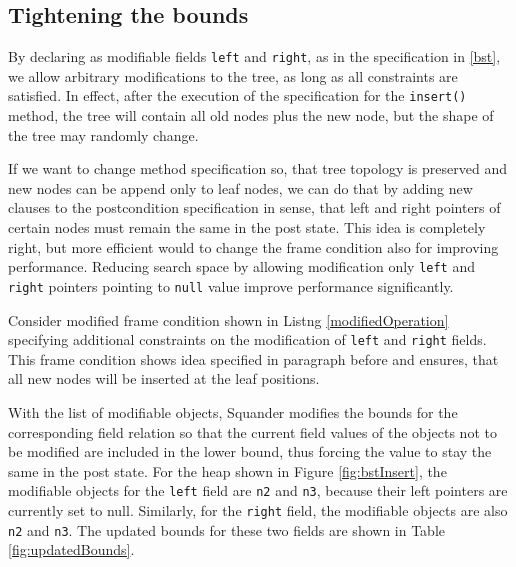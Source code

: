 \documentclass[11pt,twoside,a4paper]{book}
\begin{document}
\subsection{Tightening the bounds}
By declaring as modifiable fields \verb|left| and \verb|right|, as in the
specification in \ref{bst}, we allow arbitrary modifications to the tree, as
long as all constraints are satisfied. In effect, after the execution of the
specification for the \verb|insert()| method, the tree will contain all old
nodes plus the new node, but the shape of the tree may randomly change.

If we want to change method specification so, that tree topology is preserved
and new nodes can be append only to leaf nodes, we can do that by adding new
clauses to the postcondition specification in sense, that left and right
pointers of certain nodes must remain the same in the post state. This idea is
completely right, but more efficient would to change the frame condition also
for improving performance. Reducing search space by allowing modification only
\verb|left| and \verb|right| pointers pointing to \verb|null| value improve
performance significantly.

Consider modified frame condition shown in Listng \ref{modifiedOperation}
specifying additional constraints on the modification of \verb|left| and \verb|right| fields. This
frame condition shows idea specified in paragraph before and ensures, that all
new nodes will be inserted at the leaf positions.



With the list of modifiable objects, Squander modifies the bounds for the
corresponding field relation so that the current field values of the objects not
to be modified are included in the lower bound, thus forcing the value to stay
the same in the post state. For the heap shown in Figure \ref{fig:bstInsert},
the modifiable objects for the \verb|left| field are \verb|n2| and \verb|n3|,
because their left pointers are currently set to null. Similarly, for the
\verb|right| field, the modifiable objects are also \verb|n2| and \verb|n3|. The
updated bounds for these two fields are shown in Table \ref{fig:updatedBounds}.
\end{document}
